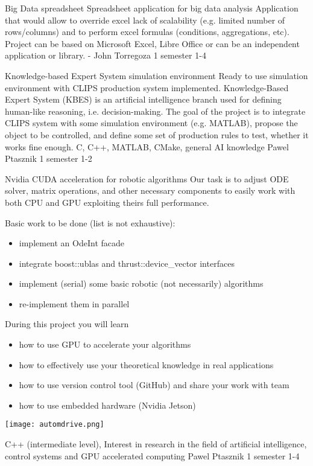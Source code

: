 \begin{project}
{Big Data spreadsheet}
{Spreadsheet application for big data analysis} 
{ 
Application that would allow to override excel lack of scalability (e.g. limited
number of rows/columns) and to perform excel formulas (conditions, aggregations,
etc). Project can be based on Microsoft Excel, Libre Office or can be an
independent application or library.
} 
{-}
{John Torregoza}
{1 semester}
{1-4}
\end{project}
\begin{project}
{Knowledge-based Expert System simulation environment}
{Ready to use simulation environment with CLIPS production system implemented.}
{
Knowledge-Based Expert System (KBES) is an artificial intelligence branch used for defining human-like reasoning, i.e. decision-making. The goal of the project is to integrate CLIPS system with some simulation environment (e.g. MATLAB), propose the object to be controlled, and define some set of production rules to test, whether it works fine enough. }
{C, C++, MATLAB, CMake, general AI knowledge}
{Pawel Ptasznik}
{1 semester}
{1-2}
\end{project}
\begin{project}
{Nvidia CUDA acceleration for robotic algorithms}
{Our task is to adjust ODE solver, matrix operations, and other necessary components to easily work with both CPU and GPU exploiting theirs full performance.}
{
Basic work to be done (list is not exhaustive):
\begin{itemize}
\item implement an OdeInt facade
\item integrate boost::ublas and thrust::device\_vector interfaces
\item implement (serial) some basic robotic (not necessarily) algorithms
\item re-implement them in parallel
\end{itemize}
During this project you will learn 
\begin{itemize}
\item how to use GPU to accelerate your algorithms
\item how to effectively use your theoretical knowledge in real applications
\item how to use version control tool (GitHub) and share your work with team
\item how to use embedded hardware (Nvidia Jetson)
\end{itemize}
\begin{center}\texttt{[image: automdrive.png]}\end{center}
}
{C++ (intermediate level), Interest in research in the field of artificial intelligence, control systems and GPU accelerated computing}
{Pawel Ptasznik}
{1 semester}
{1-4}
\end{project}
